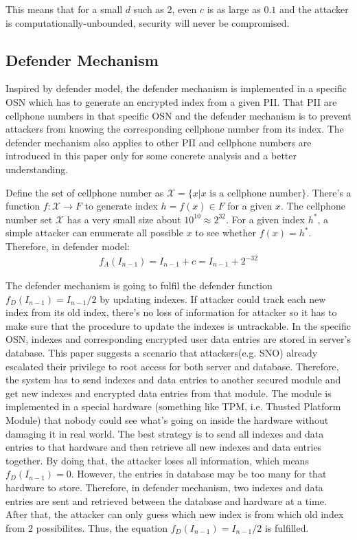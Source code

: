 \documentclass[10pt, conference, compsocconf]{IEEEtran}
\begin{document}
		This means that for a small $d$ such as $2$, even $c$ is as large as
		$0.1$ and the attacker is computationally-unbounded, security will
		never be compromised.
		
	\subsection{Defender Mechanism}\label{sec_ds}
		Inspired by defender model, the defender mechanism is implemented
		in a specific OSN
		which has to generate an encrypted index
		from a given PII. That PII are cellphone numbers
		in that specific OSN and the defender mechanism is to prevent attackers
		from knowing the corresponding cellphone number from its index.
		The defender mechanism also applies to other PII and cellphone numbers are introduced
		in this paper only for some concrete analysis and a better understanding.
		
		Define the set of cellphone number as 
		$\mathcal X = \{x | \text{$x$ is a cellphone number}\}$.
		There's a function $f: \mathcal X \rightarrow F$ to generate index $h = f(x) \in F$ for
		a given $x$. The cellphone number set $\mathcal X$ has a very small
		size about $10^{10} \approx 2^{32}$. For a given index $h^*$, a simple attacker
		can enumerate all possible $x$ to see whether $f(x) = h^*$. Therefore, in defender
		model:
		\begin{align*}
			f_A(I_{n-1}) = I_{n-1}+c = I_{n-1}+2^{-32}
		\end{align*}
		
		The defender mechanism is going to fulfil the defender
		function $f_D(I_{n-1}) = I_{n-1}/2$ by updating indexes.
		If attacker
		could track each new index from its old index, there's no loss of information 
		for attacker so it has to make sure that the procedure to update the indexes
		is untrackable.
		In the specific OSN, indexes and corresponding encrypted user data entries are stored
		in server's database. 
		This paper suggests a scenario that attackers(e.g. SNO) already
		escalated their privilege to root access for
		both server and database. Therefore, the system has to send 
		indexes and data entries to another 
		secured module and get new indexes and encrypted data 
		entries from that module. 
		The module is implemented in a special hardware (something 
		like TPM, i.e. Thusted Platform Module) that nobody
		could see what's going on inside the hardware without damaging it in real world.
		The best strategy 
		is to send all indexes and data entries to that hardware and then
		retrieve all new indexes and data entries together. By doing that, the attacker
		loses all information, which means $f_D(I_{n-1}) = 0$. However, the entries
		in database may be too many for that hardware to store. Therefore, in defender mechanism,
		two indexes and data entries are sent and retrieved
		between the database and hardware at a time. After that, the attacker can
		only guess which new index is from which old index from $2$ possibilites.
		Thus, the equation $f_D(I_{n-1}) = I_{n-1}/2$ is fulfilled.
		
\end{document}
